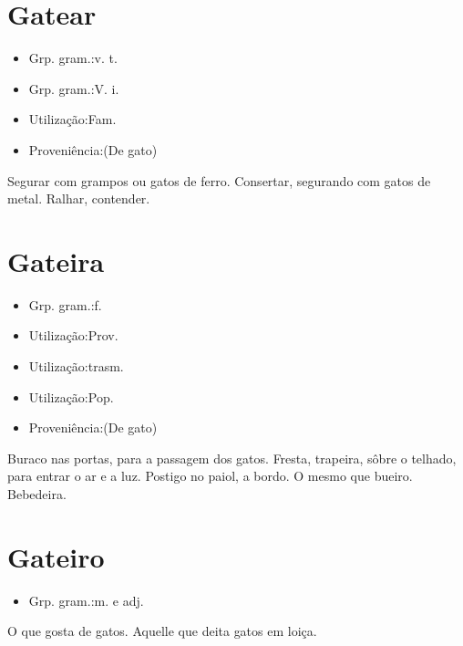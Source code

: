 \section{Gatear}
\begin{itemize}
\item {Grp. gram.:v. t.}
\end{itemize}
\begin{itemize}
\item {Grp. gram.:V. i.}
\end{itemize}
\begin{itemize}
\item {Utilização:Fam.}
\end{itemize}
\begin{itemize}
\item {Proveniência:(De \textunderscore gato\textunderscore )}
\end{itemize}
Segurar com grampos ou gatos de ferro.
Consertar, segurando com gatos de metal.
Ralhar, contender.
\section{Gateira}
\begin{itemize}
\item {Grp. gram.:f.}
\end{itemize}
\begin{itemize}
\item {Utilização:Prov.}
\end{itemize}
\begin{itemize}
\item {Utilização:trasm.}
\end{itemize}
\begin{itemize}
\item {Utilização:Pop.}
\end{itemize}
\begin{itemize}
\item {Proveniência:(De \textunderscore gato\textunderscore )}
\end{itemize}
Buraco nas portas, para a passagem dos gatos.
Fresta, trapeira, sôbre o telhado, para entrar o ar e a luz.
Postigo no paiol, a bordo.
O mesmo que \textunderscore bueiro\textunderscore .
Bebedeira.
\section{Gateiro}
\begin{itemize}
\item {Grp. gram.:m.  e  adj.}
\end{itemize}
O que gosta de gatos.
Aquelle que deita gatos em loiça.
